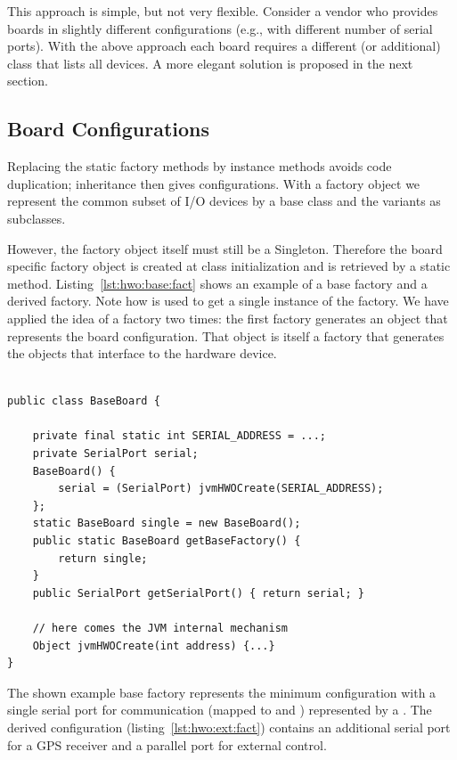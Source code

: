 This approach is simple, but not very flexible. Consider a vendor who
provides boards in slightly different configurations (e.g., with
different number of serial ports). With the above approach each board
requires a different (or additional)  class that lists
all devices. A more elegant solution is proposed in the next section.

\subsection{Board Configurations}

Replacing the static factory methods by instance methods avoids code
duplication; inheritance then gives configurations. With a factory
object we represent the common subset of I/O devices by a base class
and the variants as subclasses.

However, the factory object itself must still be a Singleton.
Therefore the board specific factory object is created at class
initialization and is retrieved by a static method.
Listing~\ref{lst:hwo:base:fact} shows an example of a base factory
and a derived factory. Note how  is used to
get a single instance of the factory. We have applied the idea of a
factory two times: the first factory generates an object that
represents the board configuration. That object is itself a factory
that generates the objects that interface to the hardware device.

\begin{lstlisting}[float=t,caption={A base class of a hardware object
factory}, label=lst:hwo:base:fact]

public class BaseBoard {

    private final static int SERIAL_ADDRESS = ...;
    private SerialPort serial;
    BaseBoard() {
        serial = (SerialPort) jvmHWOCreate(SERIAL_ADDRESS);
    };
    static BaseBoard single = new BaseBoard();
    public static BaseBoard getBaseFactory() {
        return single;
    }
    public SerialPort getSerialPort() { return serial; }

    // here comes the JVM internal mechanism
    Object jvmHWOCreate(int address) {...}
}
\end{lstlisting}

The shown example base factory represents the minimum configuration
with a single serial port for communication (mapped to
 and ) represented by a
. The derived configuration 
(listing~\ref{lst:hwo:ext:fact}) contains an additional serial port
for a GPS receiver and a parallel port for external control.

